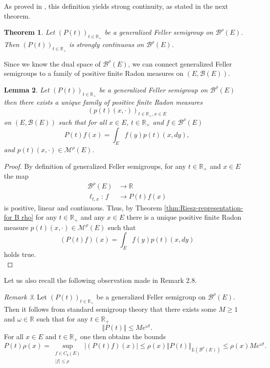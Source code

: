 \documentclass[a4paper,12pt]{article}
\newtheorem{theorem}{Theorem}[section]
\newtheorem{lemma}[theorem]{Lemma}
\theoremstyle{definition}
\theoremstyle{remark}
\newtheorem{remark}[theorem]{Remark}
\numberwithin{equation}{section}
\numberwithin{theorem}{section}
\begin{document}
As proved in \textbf{\cite{DoT}}, this definition yields strong continuity, as stated in the next theorem.

\begin{theorem}
\label{thm:generalized Feller semigroups are strongly continuous}
Let $\left(P(t)\right)_{t\in\mathbb{R}_{+}}$ be a generalized Feller
semigroup on $\mathcal{\mathscr{B}}^{\rho}(E)$. Then $\left(P(t)\right)_{t\in\mathbb{R}_{+}}$
is strongly continuous on $\mathcal{\mathscr{B}}^{\rho}(E)$.
\end{theorem}
 
 Since we know the dual space of $\mathcal{\mathscr{B}}^{\rho}(E)$,
we can connect generalized Feller semigroups to a family of positive
finite Radon measures on $\left(E,\mathcal{B}(E)\right)$. 

\begin{lemma}\label{lem:GFS induces family of measures} 
Let
$\left(P(t)\right)_{t\in\mathbb{R}_{+}}$ be a generalized Feller
semigroup on $\mathcal{\mathscr{B}}^{\rho}(E)$ then there exists a unique family of positive finite Radon measures
\[
\left(p(t)(x,\cdot)\right)_{t\in\mathbb{R}_{+},x\in E}
\]
 on $\left(E,\mathcal{B}(E)\right)$ such that for
all $x\in E$, $t\in\mathbb{R}_{+}$ and $f\in\mathcal{\mathscr{B}}^{\rho}(E)$
\[
P(t)f(x)=\int_{E}f(y)p(t)(x,dy),
\]
and $p(t)(x,\cdot)\in\mathcal{M^{\rho}}(E)$. \\
\end{lemma} 
\begin{proof}
By definition of generalized Feller semigroups, for any $t\in\mathbb{R}_{+}$
and $x\in E$ the map
\begin{align*}
\mathcal{\mathscr{B}}^{\rho}(E) & \rightarrow\mathbb{R}\\
\ell_{t,x}:\,f & \rightarrow P(t)f(x)
\end{align*}
is positive, linear and continuous. Thus, by Theorem \ref{thm:Riesz-representation-for B rho}
for any $t\in\mathbb{R}_{+}$ and any $x\in E$ there is a unique
positive finite Radon measure $p(t)(x,\cdot)\in\mathcal{M}^{\rho}(E)$
such that 
\[
\left(P(t)f\right)(x)=\int_{E}f(y)p(t)(x,dy)
\]
holds true.\\
\end{proof}

Let us also recall the following observation  made in \cite{CuT} Remark 2.8.

\begin{remark}\label{rem: definition P_t rho} 
Let
$\left(P(t)\right)_{t\in\mathbb{R}_{+}}$ be a generalized Feller
semigroup on $\mathcal{\mathscr{B}}^{\rho}(E)$. Then it follows from standard semigroup theory that there exists some $M\geq1$ and $\omega\in\mathbb{R}$ such that for any
$t\in\mathbb{R}_{+}$
\[
\left\Vert P(t)\right\Vert \leq Me^{\omega t}.
\]
For all $x\in E$ and $t\in\mathbb{R}_{+}$ 
one then obtains the bounds
\[
P(t)\rho(x)=\underset{\begin{array}{c}
f\in C_{b}(E)\\
\left|f\right|\leq\rho
\end{array}}{\sup}\left|\left(P(t)f\right)(x)\right|\leq\rho(x)\left\Vert P(t)\right\Vert _{L(\mathcal{B}^{\rho}(E))}\leq\rho(x)Me^{\omega t}.
\]
\end{remark}
\end{document}
